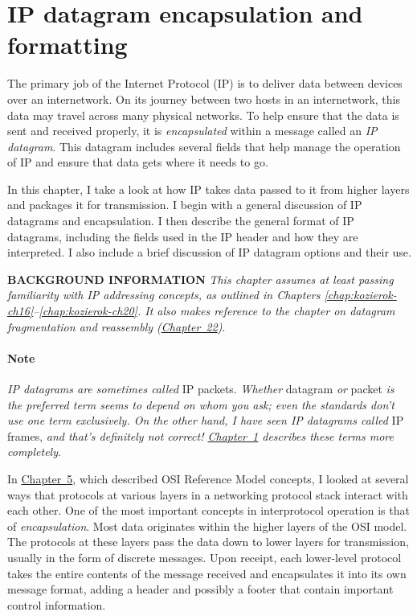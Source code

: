 \chapter{IP datagram encapsulation and formatting}
\label{chap:kozierok-ch21}


The primary job of the Internet Protocol (IP) is to deliver data between
devices over an internetwork. On its journey between two hosts in an
internetwork, this data may travel across many physical networks. To
help ensure that the data is sent and received properly, it is
{\emph{encapsulated}} within a message called an {\emph{IP datagram}}.
This datagram includes several fields that help manage the operation of
IP and ensure that data gets where it needs to go.

In this chapter, I take a look at how IP takes data passed to it from
higher layers and packages it for transmission. I begin with a general
discussion of IP datagrams and encapsulation. I then describe the
general format of IP datagrams, including the fields used in the IP
header and how they are interpreted. I also include a brief discussion
of IP datagram options and their use.


{\textbf{BACKGROUND INFORMATION}} {\emph{This chapter assumes at least
passing familiarity with IP addressing concepts, as outlined in Chapters
\vref{chap:kozierok-ch16}--\vref{chap:kozierok-ch20}.
It also makes reference to the chapter on datagram fragmentation and
reassembly (\protect\hyperlink{ch22.html}{Chapter~22})}}.

\subsubsection[Note]{\texorpdfstring{\protect\hypertarget{ch21.htmlux5cux23note-80}{}{}Note}{Note}}

\protect\hypertarget{ch21.htmlux5cux23idx-CHP-21-0773}{}{}{\emph{IP
datagrams are sometimes called}} IP packets. {\emph{Whether}} datagram
{\emph{or}} packet {\emph{is the preferred term seems to depend on whom
you ask; even the standards don't use one term exclusively. On the other
hand, I have seen IP datagrams called}} IP frames, {\emph{and that's
definitely not correct! \protect\hyperlink{ch01.html}{Chapter~1}
describes these terms more completely}}.

\protect\hypertarget{ch21.htmlux5cux23idx-CHP-21-0774}{}{}In
\protect\hyperlink{ch05.html}{Chapter~5}, which described OSI Reference
Model concepts, I looked at several ways that protocols at various
layers in a networking protocol stack interact with each other. One of
the most important concepts in interprotocol operation is that of
{\emph{encapsulation}}. Most data originates within the higher layers of
the OSI model. The protocols at these layers pass the data down to lower
layers for transmission, usually in the form of discrete messages. Upon
receipt, each lower-level protocol takes the entire contents of the
message received and encapsulates it into its own message format, adding
a header and possibly a footer that contain important control
information.

